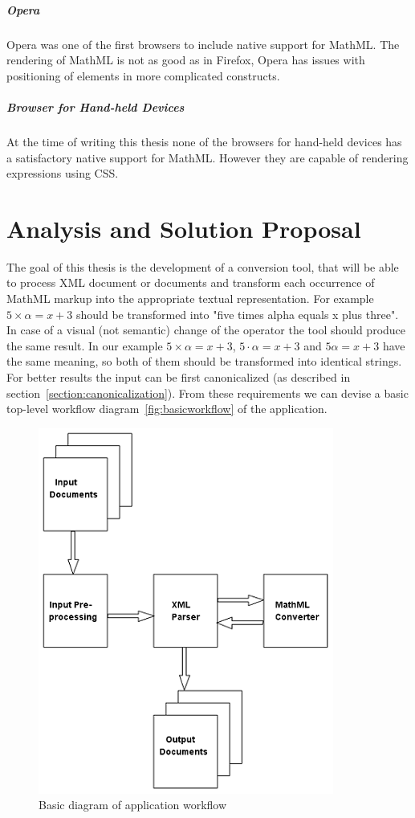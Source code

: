 \documentclass[11pt,oneside,final]{fithesis2}
\begin{document}
\paragraph*{Opera}
Opera was one of the first browsers to include native support for MathML. The rendering of MathML is not as good as in Firefox, Opera has issues with positioning of elements in more complicated constructs. 

\paragraph*{Browser for Hand-held Devices}
At the time of writing this thesis none of the browsers for hand-held devices has a satisfactory native support for MathML. However they are capable of rendering expressions using CSS.


\chapter{Analysis and Solution Proposal}
The goal of this thesis is the development of a conversion tool, that will be able to process XML document or documents and transform each occurrence of MathML markup into the appropriate textual representation. For example $5 \times \alpha = x + 3$ should be transformed into "five times alpha equals x plus three". In case of a visual (not semantic) change of the operator the tool should produce the same result. In our example $5 \times \alpha = x + 3$, $5 \cdot \alpha = x + 3$ and $5\alpha = x + 3$ have the same meaning, so both of them should be transformed into identical strings. For better results the input can be first canonicalized (as described in section~\vref{section:canonicalization}). From these requirements we can devise a basic top-level workflow diagram~\vref{fig:basicworkflow} of the application.

\begin{figure}[!ht]
\centering
\includegraphics{basic_diagram}
\caption{Basic diagram of application workflow}
\label{fig:basicworkflow}
\end{figure}
\end{document}
